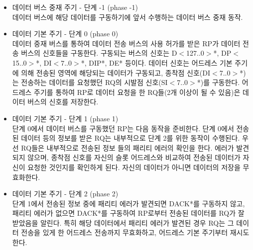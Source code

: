 \begin{itemize}
	\item 데이터 버스 중재 주기 - 단계 -1 (phase -1)\\
	데이터 버스에 해당 데이터를 구동하기에 앞서 수행하는 데이터 버스 중재 동작.
%
	\item 데이터 기본 주기 - 단계 0 (phase 0)\\
	데이터 중재 버스를 통하여 데이터 전송 버스의 사용 허가를 받은 RP가
	데이터 전송 버스의 신호들을 구동한다.
	구동되는 버스의 신호는 D$<$127..0$>$*, DP$<$15..0$>$*,
	DI$<$7..0$>$*, DIP*, DE* 등이다.
	데이터 신호는 어드레스 기본 주기에 의해 전송된 영역에 해당되는 데이터가 구동되고,
	종착점 신호(DI$<$7..0$>$*)는 전송하는 데이터를 요청했던
	RQ의 시발점 신호(SI$<$7..0$>$*)를 구동한다.
	어드레스 주기를 통하여 RP로 데이터 요청을 한 RQ들(2개 이상이 될 수 있음)은
	데이터 버스의 신호를 저장한다.
%
	\item 데이터 기본 주기 - 단계 1 (phase 1)\\
	단계 0에서 데이터 버스를 구동했던 RP는 다음 동작을 준비한다.
	단계 0에서 전송된 데이터 등의 정보를 받은 RQ는 내부적으로  단계 2를 위한 동작이 수행된다.
	우선 RQ들은 내부적으로 전송된 정보 들의 패리티 에러의 확인을 한다.
	에러가 발견되지 않으며, 종착점 신호를 자신의 슬롯 어드레스와 비교하여
	전송된 데이터가 자신이 요청한 것인지를 확인하게 된다.
	자신의 데이터가 아니면 데이터의 저장을 무효화한다.
%
	\item 데이터 기본 주기 - 단계 2 (phase 2)\\
	단계 1에서 전송된 정보 중에 패리티 에러가 발견되면 
	DACK*를 구동하지 않고, 패리티 에러가 없으면 DACK*를 구동하여 RP로부터 전송된
	데이터를 RQ가 잘 받았음을 알린다.
	특히 해당 데이터에서 패리티 에러가 발견된 경우 RQ는 그 데이터 전송을 있게 한 어드레스 전송까지 무효화하고,
	어드레스 기본 주기부터 재시도한다.
\end{itemize}
%
